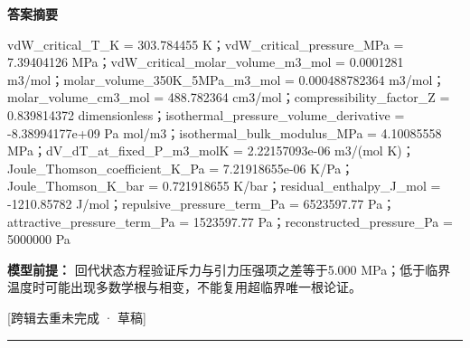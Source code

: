 \documentclass[UTF8,11pt,a4paper]{ctexart}
\begin{document}
\noindent\textbf{答案摘要}\par
vdW\_critical\_T\_K = 303.784455 K；vdW\_critical\_pressure\_MPa = 7.39404126 MPa；vdW\_critical\_molar\_volume\_m3\_mol = 0.0001281 m3/mol；molar\_volume\_350K\_5MPa\_m3\_mol = 0.000488782364 m3/mol；molar\_volume\_cm3\_mol = 488.782364 cm3/mol；compressibility\_factor\_Z = 0.839814372 dimensionless；isothermal\_pressure\_volume\_derivative = -8.38994177e+09 Pa mol/m3；isothermal\_bulk\_modulus\_MPa = 4.10085558 MPa；dV\_dT\_at\_fixed\_P\_m3\_molK = 2.22157093e-06 m3/(mol K)；Joule\_Thomson\_coefficient\_K\_Pa = 7.21918655e-06 K/Pa；Joule\_Thomson\_K\_bar = 0.721918655 K/bar；residual\_enthalpy\_J\_mol = -1210.85782 J/mol；repulsive\_pressure\_term\_Pa = 6523597.77 Pa；attractive\_pressure\_term\_Pa = 1523597.77 Pa；reconstructed\_pressure\_Pa = 5000000 Pa\par
\noindent\textbf{模型前提：}
回代状态方程验证斥力与引力压强项之差等于5.000 MPa；低于临界温度时可能出现多数学根与相变，不能复用超临界唯一根论证。\par
\noindent\textcolor{red!65!black}{[跨辑去重未完成 · 草稿]} \par
\medskip\hrule\medskip
{}
\end{document}
